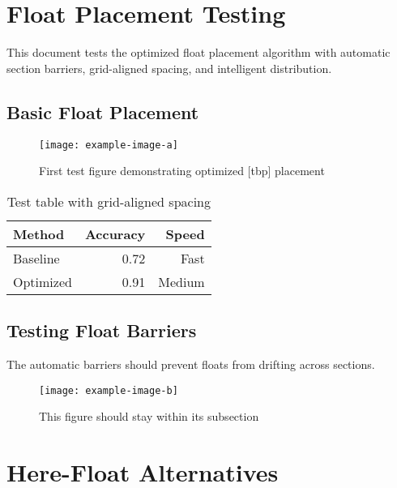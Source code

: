 \documentclass[11pt]{article}
\begin{document}
\section{Float Placement Testing}

This document tests the optimized float placement algorithm with automatic section barriers, grid-aligned spacing, and intelligent distribution.

\subsection{Basic Float Placement}

\lipsum[1]

\begin{figure}[tbp]
  \centering
  \texttt{[image: example-image-a]}
  \caption{First test figure demonstrating optimized [tbp] placement}
  \label{fig:test1}
\end{figure}

\lipsum[2-3]

\begin{table}[tbp]
  \caption{Test table with grid-aligned spacing}
  \centering
  \begin{tabular}{@{}lrr@{}}
    \toprule
    Method & Accuracy & Speed \\
    \midrule
    Baseline & 0.72 & Fast \\
    Optimized & 0.91 & Medium \\
    \bottomrule
  \end{tabular}
\end{table}

\lipsum[4]

\subsection{Testing Float Barriers}

The automatic barriers should prevent floats from drifting across sections.

\begin{figure}[tbp]
  \centering
  \texttt{[image: example-image-b]}
  \caption{This figure should stay within its subsection}
\end{figure}

\lipsum[5-6]

\section{Here-Float Alternatives}
\end{document}
